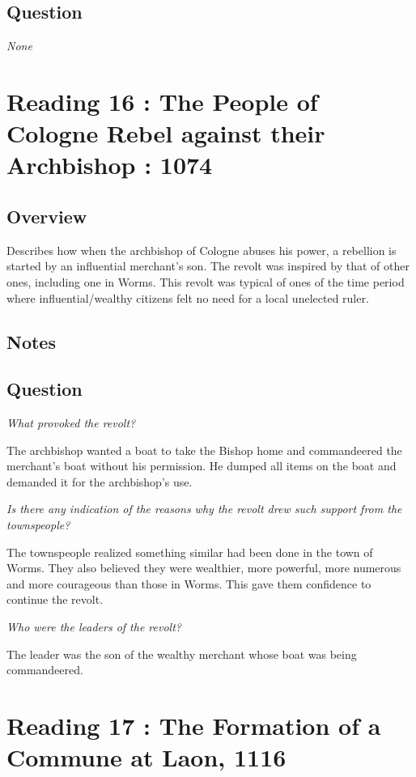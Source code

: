 \documentclass[12pt]{article}
\begin{document}
{\subsection*{Question}
	\textit{None}
	
\section*{Reading 16 : The People of Cologne Rebel against their Archbishop : 1074}

\subsection*{Overview}

Describes how when the archbishop of Cologne abuses his power, a rebellion is started by an influential merchant's son. The revolt was inspired by that of other ones, including one in Worms. This revolt was typical of ones of the time period where influential/wealthy citizens felt no need for a local  unelected ruler.

\subsection*{Notes}

\subsection*{Question}

\textit{What provoked the revolt?}

The archbishop wanted a boat to take the Bishop home and commandeered the merchant's boat without his permission. He dumped all items on the boat and demanded it for the archbishop's use.

\textit{Is there any indication of the reasons why the revolt drew such support from the townspeople?}

The townspeople realized something similar had been done in the town of Worms. They also believed they were wealthier, more powerful, more numerous and more courageous than those in Worms. This gave them confidence to continue the revolt.

\textit{Who were the leaders of the revolt?}

The leader was the son of the wealthy merchant whose boat was being commandeered.

\section*{Reading 17 : The Formation of a Commune at Laon, 1116}

}
\end{document}
